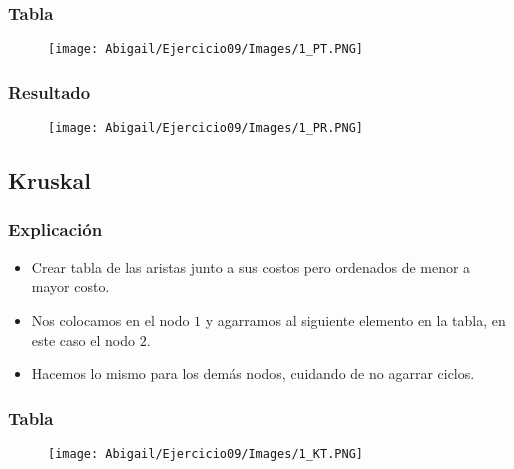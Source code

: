 \documentclass[12pt]{article}
\begin{document}
      \subsubsection{Tabla}
        \begin{figure}[h!]
          \centering
          \texttt{[image: Abigail/Ejercicio09/Images/1\_PT.PNG]}
        \end{figure} 

      \subsubsection{Resultado}
        \begin{figure}[h!]
          \centering
          \texttt{[image: Abigail/Ejercicio09/Images/1\_PR.PNG]}
        \end{figure} 

    \subsection{Kruskal}

      \subsubsection{Explicación}
        \begin{itemize}

          \item[\Checkmark] Crear tabla de las aristas junto a sus costos pero ordenados de menor a mayor costo.

          \item[\Checkmark] Nos colocamos en el nodo $1$ y agarramos al siguiente elemento en la tabla, en este caso el nodo $2$.

          \item[\Checkmark] Hacemos lo mismo para los demás nodos, cuidando de no agarrar ciclos.

        \end{itemize}

      \subsubsection{Tabla}

        \begin{figure}[h!]
          \centering
          \texttt{[image: Abigail/Ejercicio09/Images/1\_KT.PNG]}
        \end{figure} 
\end{document}
